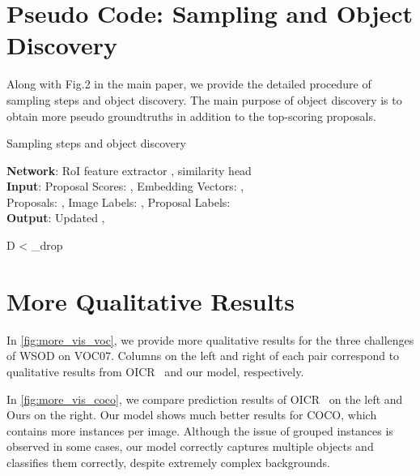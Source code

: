\documentclass[runningheads]{llncs}
\begin{document}
\section{Pseudo Code: Sampling and Object Discovery}
Along with Fig.2 in the main paper, we provide the detailed procedure of sampling steps and object discovery. The main purpose of object discovery is to obtain more pseudo groundtruths in addition to the top-scoring proposals.
\label{sec:pseudo_code}
\begin{algorithm}[H]
\caption{Sampling steps and object discovery}
\textbf{Network}: RoI feature extractor , similarity head \\
\textbf{Input}:  Proposal Scores: , Embedding Vectors: ,\\
Proposals: , Image Labels: , Proposal Labels: \\
\textbf{Output}: Updated , 
\begin{algorithmic}[1]
    \STATE 
{}
          \STATE 
            \IF {}
                \STATE 
            \ENDIF
          \ENDIF
      \ENDFOR
      \STATE \STATE \STATE D < \tau_{drop}
      \STATE 
      \STATE 
      \STATE 
    \ENDFOR
    \STATE 
{}
            \STATE 
\STATE 
            \IF {}
                \STATE \IF {}
                  \STATE 
                \ENDIF
            \ENDIF
        \ENDIF
      \ENDFOR
    \ENDFOR
\end{algorithmic}
\label{alg:OD}
\end{algorithm}

\clearpage
\section{More Qualitative Results}  
\label{sec:more_qual}
In \cref{fig:more_vis_voc}, we provide more qualitative results for the three challenges of WSOD on VOC07. 
Columns on the left and right of each pair correspond to qualitative results from OICR~\cite{Tang_2017_CVPR} and our model, respectively.

In \cref{fig:more_vis_coco}, we compare prediction results of OICR~\cite{Tang_2017_CVPR} on the left and Ours on the right.  
Our model shows much better results for COCO, which contains more instances per image. Although the issue of grouped instances is observed in some cases, our model correctly captures multiple objects and classifies them correctly, despite extremely complex backgrounds.
\end{document}
